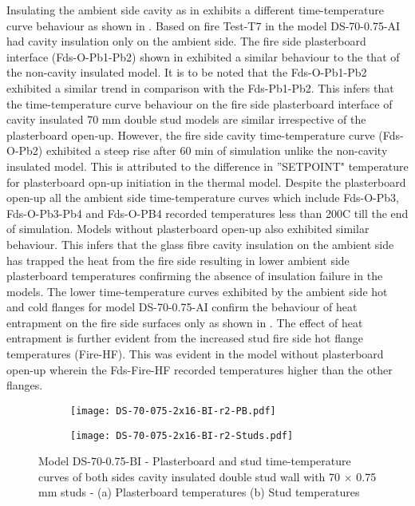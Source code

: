 Insulating the ambient side cavity as in  exhibits a different time-temperature curve behaviour as shown in . Based on fire Test-T7 in  the model DS-70-0.75-AI had cavity insulation only on the ambient side. The fire side plasterboard interface (Fds-O-Pb1-Pb2) shown in  exhibited a similar behaviour to the that of the non-cavity insulated model. It is to be noted that the Fds-O-Pb1-Pb2 exhibited a similar trend in comparison with the Fds-Pb1-Pb2. This infers that the time-temperature curve behaviour on the fire side plasterboard interface of cavity insulated 70 mm double stud models are similar irrespective of the plasterboard open-up. However, the fire side cavity time-temperature curve (Fds-O-Pb2) exhibited a steep rise after 60 min of simulation unlike the non-cavity insulated model. This is attributed to the difference in ''SETPOINT" temperature for plasterboard opn-up initiation in the thermal model. Despite the plasterboard open-up all the ambient side time-temperature curves which include Fds-O-Pb3, Fds-O-Pb3-Pb4 and Fds-O-PB4 recorded temperatures less than 200\degree C till the end of simulation. Models without plasterboard open-up also exhibited similar behaviour. This infers that the glass fibre cavity insulation on the ambient side has trapped the heat from the fire side resulting in lower ambient side plasterboard temperatures confirming the absence of insulation failure in the models. The lower time-temperature curves exhibited by the ambient side hot and cold flanges for model DS-70-0.75-AI confirm the behaviour of heat entrapment on the fire side surfaces only as shown in . The effect of heat entrapment is further evident from the increased stud fire side hot flange temperatures (Fire-HF). This was evident in the model without plasterboard open-up wherein the Fds-Fire-HF recorded temperatures higher than the other flanges.
\begin{figure}[!htbp]
	\centering
	\begin{subfigure}[b]{0.6\textwidth}
		\centering
		\texttt{[image: DS-70-075-2x16-BI-r2-PB.pdf]}
		\caption{}
		\label{subfig:DS-70-075-2x16-BI-r2-PB}
	\end{subfigure}
	\begin{subfigure}[b]{0.6\textwidth}
		\centering
		\texttt{[image: DS-70-075-2x16-BI-r2-Studs.pdf]}
		\caption{}
		\label{subfig:DS-70-075-2x16-BI-r2-Studs}
	\end{subfigure}
	   \caption{Model DS-70-0.75-BI - Plasterboard and stud time-temperature curves of both sides cavity insulated double stud wall with 70 $\times$ 0.75 mm studs - (a) Plasterboard temperatures (b) Stud temperatures}
	   \label{fig:DS-70-075-2x16-BI-r2}
\end{figure} 

